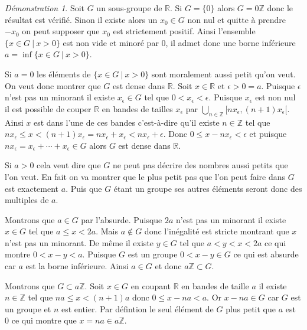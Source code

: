 \documentclass[a4paper, 11pt, french]{book}
\newenvironment{itemise}{\itemize}{\enditemize}
\theoremstyle{plain} %
\theoremstyle{definition} %
\theoremstyle{remark} %
\newtheorem*{demonstration}{Démonstration}
\newcommand{\1}{\mathds{1}}
\newcommand{\Z}{\mathbb{Z}}
\newcommand{\R}{\mathbb{R}}
\newcommand\ens[2]{\{#1 \ |\ #2\}}
\begin{document}
\begin{demonstration}
	Soit $G$ un sous-groupe de $\R$.
	Si $G = \{ 0 \}$ alors $G = 0\Z$ donc le résultat est vérifié.
	Sinon il existe alors un $x_0\in G$ non nul et quitte à prendre $-x_0$ on peut supposer que $x_0$ est strictement positif.
	Ainsi l’ensemble $\ens{x\in G}{x > 0}$ est non vide et minoré par 0, il admet donc une borne inférieure $a=\inf\ens{x\in G}{x > 0}$.
	\begin{itemise}
		\item Si $a = 0$ les éléments de $\ens{x\in G}{x > 0}$ sont moralement aussi petit qu'on veut.
		On veut donc montrer que $G$ est dense dans $\R$.
		Soit $x\in\R$ et $\epsilon > 0 = a$.
		Puisque $\epsilon$ n'est pas un minorant il existe $x_\epsilon\in G$ tel que $0 < x_\epsilon < \epsilon$.
		Puisque $x_\epsilon$ est non nul il est possible de couper $\R$ en bandes de tailles $x_\epsilon$ par $\bigcup_{n\in\Z}[nx_\epsilon, (n+1)x_\epsilon[$.
		Ainsi $x$ est dans l'une de ces bandes c'est-à-dire qu'il existe $n\in\Z$ tel que $nx_\epsilon\leqslant x < (n + 1)x_\epsilon=nx_\epsilon + x_\epsilon < nx_\epsilon + \epsilon$.
		Donc $0\leqslant x - nx_\epsilon < \epsilon$ et puisque $nx_\epsilon = x_\epsilon + \cdots + x_\epsilon\in G$ alors $G$ est dense dans $\R$.
		\item Si $a>0$ cela veut dire que $G$ ne peut pas décrire des nombres aussi petits que l'on veut.
		En fait on va montrer que le plus petit pas que l'on peut faire dans $G$ est exactement $a$.
		Puis que $G$ étant un groupe ses autres éléments seront donc des multiples de $a$.
		\begin{itemise}
			\item Montrons que $a\in G$ par l'absurde.
			Puisque $2a$ n'est pas un minorant il existe $x\in G$ tel que $a \leqslant x < 2a$.
			Mais $a\notin G$ donc l'inégalité est stricte montrant que $x$ n'est pas un minorant.
			De même il existe $y\in G$ tel que $a < y < x < 2a$ ce qui montre $0 < x - y < a$.
			Puisque $G$ est un groupe $0 < x - y\in G$ ce qui est absurde car $a$ est la borne inférieure.
			Ainsi $a\in G$ et donc $a\Z\subset G$.
			\item Montrons que $G\subset a\Z$.
			Soit $x\in G$ en coupant $\R$ en bandes de taille $a$ il existe $n\in\Z$ tel que $na\leqslant x<(n+1)a$ donc $0\leqslant x - na < a$.
			Or $x - na\in G$ car $G$ est un groupe et $n$ est entier.
			Par défintion le seul élément de $G$ plus petit que $a$ est $0$ ce qui montre que $x=na\in a\Z$.
		\end{itemise}
	\end{itemise}
\end{demonstration}
\end{document}
